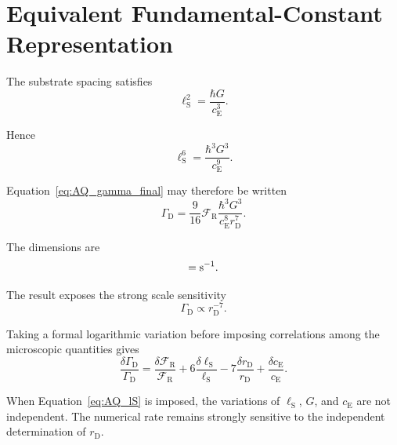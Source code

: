 \section{Equivalent Fundamental-Constant Representation}

The substrate spacing satisfies
\begin{equation}
    \ell_{\mathrm S}^{2}
    =
    \frac{
        \hbar G
    }{
        c_{\mathrm E}^{3}
    }.
    \label{eq:AQ_lS}
\end{equation}

Hence
\begin{equation}
    \ell_{\mathrm S}^{6}
    =
    \frac{
        \hbar^3G^3
    }{
        c_{\mathrm E}^{9}
    }.
\end{equation}

Equation~\eqref{eq:AQ_gamma_final} may therefore be written
\begin{equation}
    \boxed{
    \Gamma_{\mathrm D}
    =
    \frac{9}{16}
    \mathcal F_{\mathrm R}
    \frac{
        \hbar^3G^3
    }{
        c_{\mathrm E}^{8}
        r_{\mathrm D}^{7}
    }.
    }
    \label{eq:AQ_gamma_fundamental}
\end{equation}

The dimensions are
\begin{equation}
    [\Gamma_{\mathrm D}]
    =
    {\rm s^{-1}}.
\end{equation}

The result exposes the strong scale sensitivity
\begin{equation}
    \boxed{
    \Gamma_{\mathrm D}
    \propto
    r_{\mathrm D}^{-7}.
    }
    \label{eq:AQ_rD_scaling}
\end{equation}

Taking a formal logarithmic variation before imposing correlations among the
microscopic quantities gives
\begin{equation}
    \frac{
        \delta\Gamma_{\mathrm D}
    }{
        \Gamma_{\mathrm D}
    }
    =
    \frac{
        \delta\mathcal F_{\mathrm R}
    }{
        \mathcal F_{\mathrm R}
    }
    +
    6
    \frac{
        \delta\ell_{\mathrm S}
    }{
        \ell_{\mathrm S}
    }
    -
    7
    \frac{
        \delta r_{\mathrm D}
    }{
        r_{\mathrm D}
    }
    +
    \frac{
        \delta c_{\mathrm E}
    }{
        c_{\mathrm E}
    }.
    \label{eq:AQ_sensitivity}
\end{equation}

When Equation~\eqref{eq:AQ_lS} is imposed, the variations of
$\ell_{\mathrm S}$, $G$, and $c_{\mathrm E}$ are not independent. The numerical
rate remains strongly sensitive to the independent determination of
$r_{\mathrm D}$.

